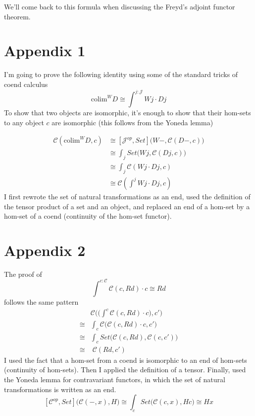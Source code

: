 \documentclass[11pt]{amsart}
\begin{document}
We'll come back to this formula when discussing the Freyd's adjoint functor theorem.

\section{Appendix 1}
I'm going to prove the following identity using some of the standard tricks of coend calculus
\[\mbox{colim}^W D \cong \int^{j \colon \mathcal{J}} W j \cdot D j\]
To show that two objects are isomorphic, it's enough to show that their hom-sets to any object $c$ are isomorphic (this follows from the Yoneda lemma) 

\begin{align*}
\mathcal{C}(\mbox{colim}^W D, c) & \cong [\mathcal{J}^{op}, Set]\big(W-, \mathcal{C}(D -, c)\big) \\
 &\cong \int_j Set \big(W j, \mathcal{C}(D j, c)\big) \\
 &\cong \int_j \mathcal{C}(W j \cdot D j, c) \\
 &\cong \mathcal{C}(\int^j W j \cdot D j, c)
\end{align*}
I first rewrote the set of natural transformations as an end, used the definition of the tensor product of a set and an object, and replaced an end of a hom-set by a hom-set of a coend (continuity of the hom-set functor).

\section{Appendix 2}
The proof of
\[ \int^{c \colon \mathcal{C}} \mathcal{C}(c, R d) \cdot c \cong R d\]
follows the same pattern
\begin{align*}
&\mathcal{C}\Big( \big(\int^{c} \mathcal{C}(c, R d) \cdot c\big) , c'\Big)\\
\cong &\int_c \mathcal{C}\big( \mathcal{C}(c, R d) \cdot c , c'\big) \\
\cong &\int_c Set\big( \mathcal{C}(c, R d) , \mathcal{C}(c, c')\big) \\
\cong & \; \mathcal{C}(R d, c') 
\end{align*}
I used the fact that a hom-set from a coend is isomorphic to an end of hom-sets (continuity of hom-sets). Then I applied the definition of a tensor. Finally, used the Yoneda lemma for contravariant functors, in which the set of natural transformations is written as an end. 
\[ [ \mathcal{C}^{op}, Set]\big(\mathcal{C}(-, x), H \big) \cong \int_c Set \big( \mathcal{C}(c, x), H c \big) \cong H x\]
\end{document}
